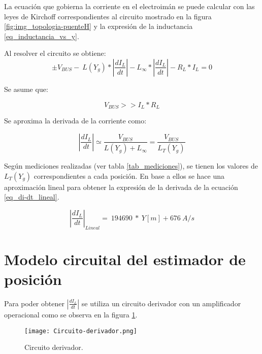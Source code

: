 \noindent La ecuaci\'{o}n que gobierna la corriente en el electroim\'{a}n se puede calcular con las leyes de Kirchoff correspondientes al circuito mostrado en la figura \ref{fig:img_topologia-puenteH} y la expresión de la inductancia \ref{eq_inductancia_vs_y}.


\noindent Al resolver el circuito se obtiene:
\begin{equation} \label{eq_VbusCondicion}
	\pm V_{BUS}-\ L(Y_g)*\left|\frac{{dI}_L}{dt}\right|-L_{\infty }*\left|\frac{{dI}_L}{dt}\right|-R_L*I_L=0
\end{equation}


\noindent Se asume que:

\begin{equation} \label{eq_Derivadadi-dt}
	V_{BUS}>>I_L*R_L
\end{equation}
 
\noindent Se aproxima la derivada de la corriente como:

\begin{equation} \label{eq_derivadaAproximacion}
	\left|\frac{{dI}_L}{dt}\right|\simeq \frac{V_{BUS}}{L(Y_g)+L_{\infty }}=\frac{V_{BUS}}{L_T(Y_g)}
\end{equation}

\noindent Según mediciones realizadas (ver tabla \ref{tab_mediciones}), se tienen los valores de $L_T(Y_g)$ correspondientes a cada posici\'{o}n. En base a ellos se hace una aproximaci\'{o}n lineal para obtener la expresi\'{o}n de la derivada de la ecuaci\'{o}n \ref{eq_di-dt_lineal}.

\noindent 

\begin{equation} \label{eq_di-dt_lineal}
{\left|\frac{{dI}_L}{dt}\right|}_{Lineal}=\ 194690\ *\ Y[m]+676\ A/s
\end{equation}

\section{Modelo circuital del estimador de posici\'{o}n}

\noindent Para poder obtener $\left|\frac{{dI}_L}{dt}\right|$ se utiliza un circuito derivador con un amplificador operacional como se observa en la figura  \ref{fig:img_Circuito-derivador}.

\begin{figure}[H]
	\centering
	\texttt{[image: Circuito-derivador.png]}
	\caption{Circuito derivador.}
	\label{fig:img_Circuito-derivador}
\end{figure}


